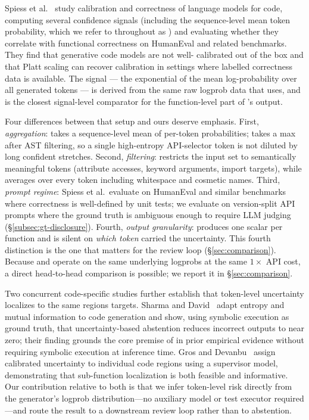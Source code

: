 Spiess et al.~\cite{spiess2025calibration} study calibration and
correctness of language models for code, computing several confidence
signals (including the sequence-level mean token probability, which
we refer to throughout as \papg) and evaluating whether they
correlate with functional correctness on HumanEval and related
benchmarks. They find that generative code models are not well-%
calibrated out of the box and that Platt scaling can recover
calibration in settings where labelled correctness data is available.
The \papg signal --- the exponential of the mean log-probability over
all generated tokens --- is derived from the same raw logprob data
that \eps uses, and is the closest signal-level comparator for the
function-level part of \eps's output.

Four differences between that setup and ours deserve emphasis. First,
\emph{aggregation}: \papg takes a sequence-level mean of per-token
probabilities; \eps takes a max after AST filtering, so a single
high-entropy API-selector token is not diluted by long confident
stretches. Second, \emph{filtering}: \eps restricts the input set to
semantically meaningful tokens (attribute accesses, keyword arguments,
import targets), while \papg averages over every token including
whitespace and cosmetic names. Third, \emph{prompt regime}: Spiess et
al.\ evaluate on HumanEval and similar benchmarks where correctness
is well-defined by unit tests; we evaluate on version-split API
prompts where the ground truth is ambiguous enough to require LLM
judging (\S\ref{subsec:gt-disclosure}). Fourth, \emph{output
granularity}: \papg produces one scalar per function and is silent on
\emph{which token} carried the uncertainty. This fourth distinction
is the one that matters for the review loop (\S\ref{sec:comparison}).
Because \papg and \eps operate on the same underlying logprobs at the
same $1\times$ API cost, a direct head-to-head comparison is
possible; we report it in \S\ref{sec:comparison}.

Two concurrent code-specific studies further establish that token-level
uncertainty localizes to the same regions \eps targets. Sharma and
David~\cite{sharma2025multisample} adapt entropy and mutual information
to code generation and show, using symbolic execution as ground truth,
that uncertainty-based abstention reduces incorrect outputs to near
zero; their finding grounds the core premise of \eps in prior empirical
evidence without requiring symbolic execution at inference time. Gros
and Devanbu~\cite{gros2025localized} assign calibrated uncertainty to
individual code regions using a supervisor model, demonstrating that
sub-function localization is both feasible and informative. Our
contribution relative to both is that we infer token-level risk
directly from the generator's logprob distribution---no auxiliary model
or test executor required---and route the result to a downstream review
loop rather than to abstention.

